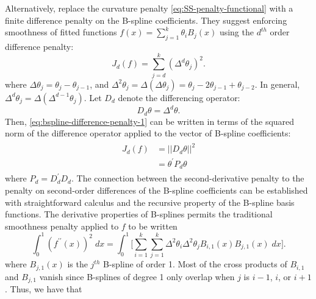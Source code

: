 Alternatively, \cite{eilers1996flexible} replace the curvature penalty \eqref{eq:SS-penalty-functional} with a finite difference penalty on the B-spline coefficients. They suggest enforcing smoothness of fitted functions $f\left(x\right) = \sum\limits_{j=1}^k \theta_i B_j\left(x\right)$ using the $d^{th}$ order difference penalty:
\begin{equation} \label{eq:bspline-difference-penalty-1}
J_d\left( f \right) = \sum_{j=d}^k \left(\Delta^d \theta_j\right)^2.
\end{equation} 
\noindent
where $\Delta \theta_j = \theta_j - \theta_{j-1}$, and $\Delta^2 \theta_j = \Delta\left(\Delta \theta_j\right) = \theta_j - 2\theta_{j-1} + \theta_{j-2}$. In general, $\Delta^d \theta_j = \Delta\left(\Delta^{d-1} \theta_j \right)$. Let $D_d$ denote the differencing operator:
\[
D_d\theta = \Delta^d \theta.
\]
\noindent
Then, \eqref{eq:bspline-difference-penalty-1} can be written in terms of the squared norm of the difference operator applied to the vector of B-spline coefficients:
\begin{align} 
\begin{split} \label{eq:bspline-difference-penalty-2}
J_d\left( f \right) &= \vert \vert D_d\theta \vert \vert^2 \\
&= \theta^\prime P_d \theta
\end{split}
\end{align}
\noindent
where $P_d = D_d^\prime D_d$.  The connection between the second-derivative penalty to the penalty on second-order differences of the B-spline coefficients can be established with straightforward calculus and the recursive property of the B-spline basis functions.  The derivative properties of B-splines permits the traditional smoothness penalty applied to $f$ to be written 
\begin{equation*} \label{eq:second-derivative-bspline-penalty}
\int_0^1 \left( f^{\prime \prime}\left(x\right)\right)^2\;dx =  \int_{0}^{1}  \bigg[ \sum\limits_{i=1}^k \sum\limits_{j=1}^k \Delta^2 \theta_i \Delta^2 \theta_j B_{i,1}\left(x\right)B_{j,1}\left(x\right) \;dx\bigg]. 
\end{equation*}
\noindent
where $B_{j,1}\left(x\right)$ is the $j^{th}$ B-spline of order 1. Most of the cross products of $B_{i,1}$ and $B_{j,1}$ vanish since B-splines of degree 1 only overlap when $j$ is $i-1$, $i$, or $i+1$. Thus, we have that
